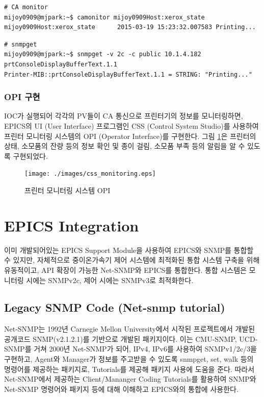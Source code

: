 \documentclass[11pt
  , a4paper
  , article
  , oneside
]{memoir}
\begin{document}
\begin{enumerate}
\begin{lstlisting}[style=termstyle]
# CA monitor
mijoy0909@mjpark:~$ camonitor mijoy0909Host:xerox_state
mijoy0909Host:xerox_state      2015-03-19 15:23:32.007583 Printing...  
\end{lstlisting}

\begin{lstlisting}[style=termstyle]
# snmpget
mijoy0909@mjpark:~$ snmpget -v 2c -c public 10.1.4.182 prtConsoleDisplayBufferText.1.1
Printer-MIB::prtConsoleDisplayBufferText.1.1 = STRING: "Printing..."
\end{lstlisting}

\end{enumerate}

\subsection{OPI 구현}
IOC가 실행되어 각각의 PV들이 CA 통신으로 프린터기의 정보를 모니터링하면, EPICS의 UI (User Interface) 프로그램인 CSS (Control System Studio)를 사용하여 프린터 모니터링 시스템의 OPI (Operator Interface)를 구현한다. 그림 \ref{fig:css_monitoring}은 프린터의 상태, 소모품의 잔량 등의 정보 확인 및 종이 걸림, 소모품 부족 등의 알림을 알 수 있도록 구현되었다.

\begin{figure}[h!]
  \centering
  \texttt{[image: ./images/css\_monitoring.eps]}
  \caption{프린터 모니터링 시스템 OPI}
  \label{fig:css_monitoring}   
\end{figure}

\clearpage

\chapter{EPICS Integration}
이미 개발되어있는 EPICS Support Module을 사용하여 EPICS와 SNMP를 통합할 수 있지만, 자체적으로 중이온가속기 제어 시스템에 최적화된 통합 시스템 구축을 위해 유동적이고, API 확장이 가능한 Net-SNMP와 EPICS를 통합한다. 통합 시스템은 모니터링 시에는 SNMPv2c, 제어 시에는 SNMPv3로 최적화한다.

\section{Legacy SNMP Code (Net-snmp tutorial)}
Net-SNMP는 1992년 Carnegie Mellon University에서 시작된 프로젝트에서 개발된 공개코드 SNMP(v2.1.2.1)를 기반으로 개발된 패키지이다. 이는 CMU-SNMP, UCD-SNMP를 거쳐 2000년 Net-SNMP가 되어, IPv4, IPv6를 사용하여 SNMPv1/2c/3을 구현하고, Agent와 Manager가 정보를 주고받을 수 있도록 snmpget, set, walk 등의 명령어를 제공하는 패키지로, Tutorials를 제공해 패키지 사용에 도움을 준다\citep{netsnmp}\citep{tutorials}. 따라서 Net-SNMP에서 제공하는 Client/Mananger Coding Tutorials를 활용하여 SNMP와 Net-SNMP 명령어와 패키지 등에 대해 이해하고 EPICS와의 통합에 사용한다. 
 
\end{document}
